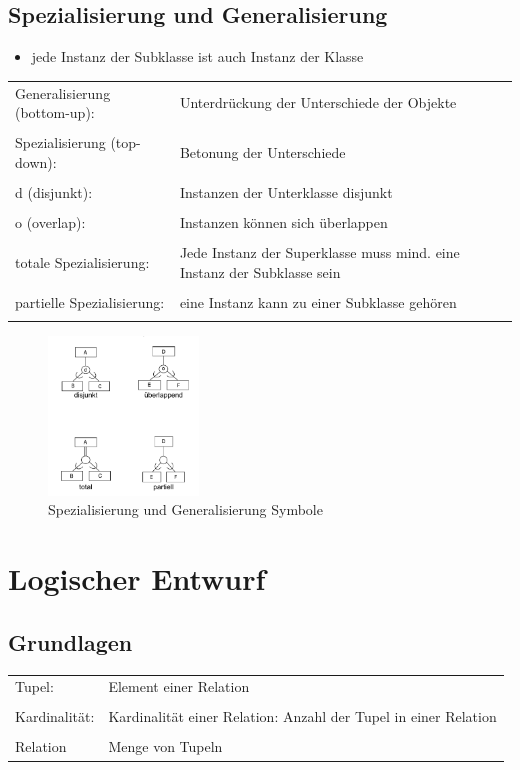 \documentclass[a4paper]{article}
\begin{document}
\subsection{Spezialisierung und Generalisierung}
\begin{itemize}
    \item jede Instanz der Subklasse ist auch Instanz der Klasse
\end{itemize}
\begin{tabular}{l p{10cm}}
    Generalisierung (bottom-up): &  Unterdrückung der Unterschiede der Objekte \\
    & \\
    Spezialisierung (top-down): & Betonung der Unterschiede \\
    & \\
    d (disjunkt): & Instanzen der Unterklasse disjunkt \\
    & \\
    o (overlap): & Instanzen können sich überlappen \\
    & \\
    totale Spezialisierung: & Jede Instanz der Superklasse muss mind. eine Instanz der Subklasse sein \\
    & \\
    partielle Spezialisierung: & eine Instanz kann zu einer Subklasse gehören \\
    & \\
\end{tabular}

\begin{figure}[htp]
    \centering
    \includegraphics[width=4cm]{images/SpezialisierungGeneralisierung.png}
    \caption{Spezialisierung und Generalisierung Symbole}
    \label{fig:SpezialisierungGeneralisierung}
\end{figure}

\section{Logischer Entwurf}

\subsection{Grundlagen}
\begin{tabular}{l p{10cm}}
    Tupel: &  Element einer Relation \\
    & \\
    Kardinalität: & Kardinalität einer Relation: Anzahl der Tupel in einer Relation \\
    & \\
    Relation & Menge von Tupeln \\
\end{tabular}
\end{document}
